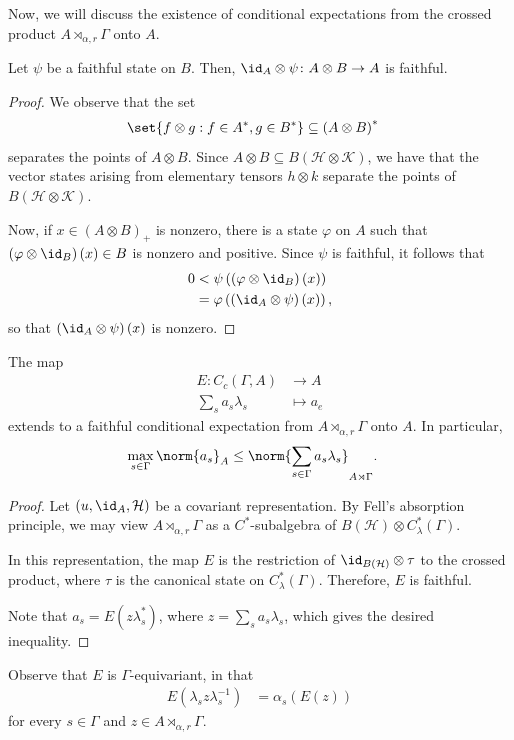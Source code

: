 \documentclass[10pt]{mypackage}
\begin{document}
Now, we will discuss the existence of conditional expectations from the crossed product $A\rtimes_{\alpha,r}\Gamma$ onto $A$.
\begin{lemma}
  Let $\psi$ be a faithful state on $B$. Then, $\id_A\otimes \psi \colon A\otimes B \rightarrow A$ is faithful.
\end{lemma}
\begin{proof}
  We observe that the set
  \begin{align*}
    \set{f\otimes g : f\in A^{\ast},g\in B^{\ast}} &\subseteq \left( A\otimes B \right)^{\ast}
  \end{align*}
  separates the points of $A\otimes B$. Since $A\otimes B\subseteq B\left( \mathcal{H}\otimes \mathcal{K} \right)$, we have that the vector states arising from elementary tensors $h\otimes k$ separate the points of $B\left( \mathcal{H}\otimes \mathcal{K} \right)$.

  Now, if $x\in \left( A\otimes B \right)_{+}$ is nonzero, there is a state $\varphi$ on $A$ such that $\left( \varphi\otimes\id_B \right)(x)\in B$ is nonzero and positive. Since $\psi$ is faithful, it follows that
  \begin{align*}
    0 &< \psi\left( \left( \varphi\otimes \id_B \right)(x) \right)\\
      &= \varphi\left( \left( \id_A\otimes\psi \right)(x) \right),
  \end{align*}
  so that $\left( \id_A\otimes\psi \right)(x)$ is nonzero.
\end{proof}
\begin{proposition}
  The map
  \begin{align*}
    E\colon C_c\left( \Gamma,A \right) &\rightarrow A\\
    \sum_{s}a_s\lambda_s &\mapsto a_e
  \end{align*}
  extends to a faithful conditional expectation from $A\rtimes_{\alpha,r}\Gamma$ onto $A$. In particular,
  \begin{align*}
    \max_{s\in\Gamma}\norm{a_s}_{A} &\leq \norm{\sum_{s\in\Gamma}a_s\lambda_s}_{A\rtimes\Gamma}.
  \end{align*}
\end{proposition}
\begin{proof}
  Let $\left( u,\id_A,\mathcal{H} \right)$ be a covariant representation. By Fell's absorption principle, we may view $A\rtimes_{\alpha,r}\Gamma$ as a $C^{\ast}$-subalgebra of $B\left( \mathcal{H} \right)\otimes C^{\ast}_{\lambda}\left( \Gamma \right)$.

  In this representation, the map $E$ is the restriction of $\id_{B\left( \mathcal{H} \right)}\otimes \tau$ to the crossed product, where $ \tau $ is the canonical state on $C^{\ast}_{\lambda}\left( \Gamma \right)$. Therefore, $E$ is faithful.

  Note that $a_s = E\left( z\lambda_s^{\ast} \right)$, where $z = \sum_{s}a_s\lambda_s$, which gives the desired inequality.
\end{proof}
Observe that $E$ is $\Gamma$-equivariant, in that
\begin{align*}
  E\left( \lambda_s z \lambda_s^{-1} \right) &= \alpha_s\left( E\left( z \right) \right)
\end{align*}
for every $s\in \Gamma$ and $z\in A\rtimes_{\alpha,r}\Gamma$.
\end{document}
